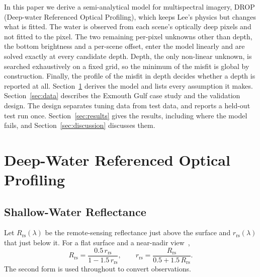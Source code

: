 \documentclass[remotesensing,article,submit,pdftex]{Definitions/mdpi}
\begin{document}
In this paper we derive a semi-analytical model for multispectral imagery, DROP (Deep-water Referenced Optical Profiling), which keeps Lee's physics but changes what is fitted. The water is observed from each scene's optically deep pixels and not fitted to the pixel. The two remaining per-pixel unknowns other than depth, the bottom brightness and a per-scene offset, enter the model linearly and are solved exactly at every candidate depth. Depth, the only non-linear unknown, is searched exhaustively on a fixed grid, so the minimum of the misfit is global by construction. Finally, the profile of the misfit in depth decides whether a depth is reported at all. Section~\ref{sec:model} derives the model and lists every assumption it makes. Section~\ref{sec:data} describes the Exmouth Gulf case study and the validation design. The design separates tuning data from test data, and reports a held-out test run once. Section~\ref{sec:results} gives the results, including where the model fails, and Section~\ref{sec:discussion} discusses them.

\section{Deep-Water Referenced Optical Profiling}\label{sec:model}

\subsection{Shallow-Water Reflectance}\label{sec:rt}

Let $R_\mathrm{rs}(\lambda)$ be the remote-sensing reflectance just above the surface and $r_\mathrm{rs}(\lambda)$ that just below it. For a flat surface and a near-nadir view~\cite{lee1999},
\begin{equation}
R_\mathrm{rs} = \frac{0.5\,r_\mathrm{rs}}{1 - 1.5\,r_\mathrm{rs}}, \qquad r_\mathrm{rs} = \frac{R_\mathrm{rs}}{0.5 + 1.5\,R_\mathrm{rs}}. \label{eq:interface}
\end{equation}
The second form is used throughout to convert observations.
\end{document}
